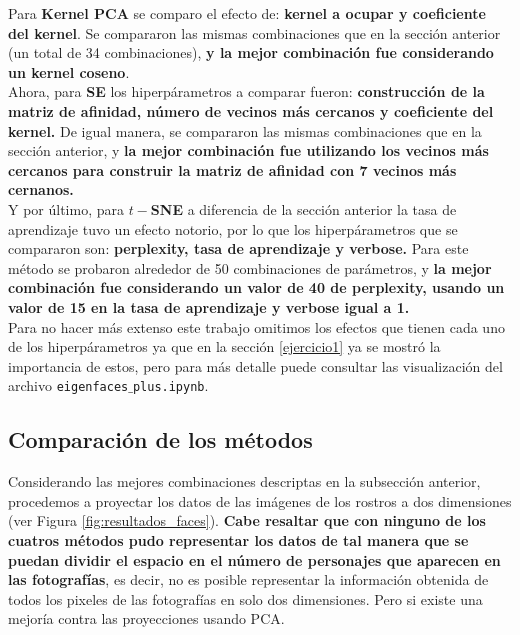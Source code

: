 \documentclass[paper=letter, fontsize=11pt]{scrartcl}
\numberwithin{equation}{section} %
\numberwithin{figure}{section} %
\numberwithin{table}{section} %
\begin{document}
Para \textbf{Kernel PCA} se comparo el efecto de: \textbf{kernel a ocupar y coeficiente del kernel}. Se compararon las mismas combinaciones que en la sección anterior (un total de 34 combinaciones), \textbf{y la mejor combinación fue considerando un kernel coseno}. \\

Ahora, para \textbf{SE} los hiperpárametros a comparar fueron: \textbf{construcción de la matriz de afinidad, número de vecinos más cercanos y coeficiente del kernel.} De igual manera, se compararon las mismas combinaciones que en la sección anterior, y \textbf{la mejor combinación fue utilizando los vecinos más cercanos para construir la matriz de afinidad con 7 vecinos más cernanos.} \\

Y por último, para \textbf{$t-$SNE} a diferencia de la sección anterior la tasa de aprendizaje tuvo un efecto notorio, por lo que los hiperpárametros que se compararon son: \textbf{perplexity, tasa de aprendizaje y verbose.} Para este método se probaron alrededor de 50 combinaciones de parámetros, y \textbf{la mejor combinación fue considerando un valor de 40 de perplexity, usando un valor de 15 en la tasa de aprendizaje y verbose igual a 1.}\\

Para no hacer más extenso este trabajo omitimos los efectos que tienen cada uno de los hiperpárametros ya que en la sección \ref{ejercicio1} ya se mostró la importancia de estos, pero para más detalle puede consultar las visualización del archivo \texttt{eigenfaces$\_$plus.ipynb}. 

\subsection{Comparación de los métodos}
Considerando las mejores combinaciones descriptas en la subsección anterior, procedemos a proyectar los datos de las imágenes de los rostros a dos dimensiones (ver Figura \ref{fig:resultados_faces}). \textbf{Cabe resaltar que con ninguno de los cuatros métodos pudo representar los datos de tal manera que se puedan dividir el espacio en el número de personajes que aparecen en las fotografías}, es decir, no es posible representar la información obtenida de todos los pixeles de las fotografías en solo dos dimensiones. Pero si existe una mejoría contra las proyecciones usando PCA.\\
\end{document}

